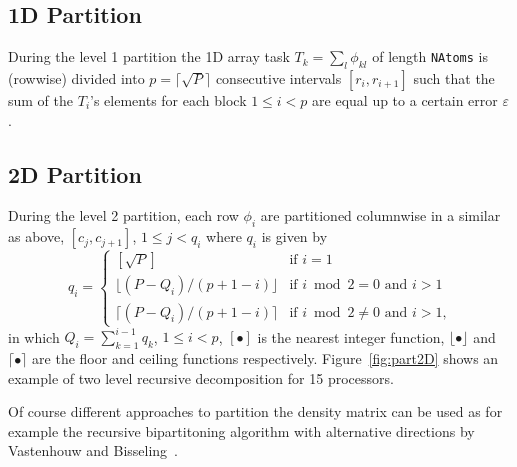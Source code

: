 \documentclass[prl,twocolumn,showpacs,twocolumngrid,superbib]{revtex4}
\begin{document}
\subsection{1D Partition}
 During the level 1 partition the 1D array task $T_k=\sum_l\phi_{kl}$ of length {\tt NAtoms}
 is (rowwise) divided into $p=\lceil\sqrt{P}\rceil$ consecutive intervals $[r_i,r_{i+1}]$ such
 that the sum of the $T_i$'s elements for
 each block $1 \le i < p$ are equal up to a certain error
 $\varepsilon$. 
\subsection{2D Partition}
 During the level 2 partition, each row $\phi_i$ are partitioned columnwise in a similar as above,
 $[c_j,c_{j+1}]$, $1 \le j < q_i$ where $q_i$ is given
 by 
\begin{equation}
  q_i = \left\{ \begin{array}{ll}
    [\sqrt{P}]                    & \textrm{if $i=1$}\\
    \lfloor(P-Q_i)/(p+1-i)\rfloor & \textrm{if $i\bmod2=0$ and $i>1$}\\
    \lceil (P-Q_i)/(p+1-i)\rceil  & \textrm{if $i\bmod2\ne0$ and $i>1$,}
    \end{array} \right.
\end{equation}
 in which $Q_i=\sum_{k=1}^{i-1}q_k$, $1 \le i < p$, $[\bullet]$ 
 is the nearest integer function, $\lfloor\bullet\rfloor$ and $\lceil\bullet\rceil$
 are the floor and ceiling functions respectively.
 Figure~\ref{fig:part2D} shows an example of two level recursive decomposition
 for 15 processors.
 
 Of course different approaches to partition the density matrix can be 
 used as for example the recursive bipartitoning algorithm with
 alternative directions by Vastenhouw and Bisseling~\cite{BVastenhouw}.
\end{document}
